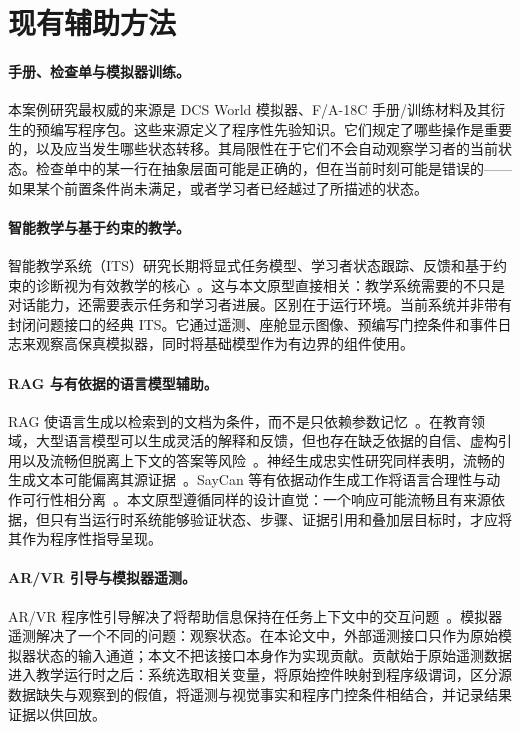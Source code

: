 \section{现有辅助方法}\label{sec:bg-existing}

\paragraph{手册、检查单与模拟器训练。}
本案例研究最权威的来源是 DCS World 模拟器、F/A-18C 手册/训练材料及其衍生的预编写程序包。这些来源定义了程序性先验知识。它们规定了哪些操作是重要的，以及应当发生哪些状态转移。其局限性在于它们不会自动观察学习者的当前状态。检查单中的某一行在抽象层面可能是正确的，但在当前时刻可能是错误的——如果某个前置条件尚未满足，或者学习者已经越过了所描述的状态。

\paragraph{智能教学与基于约束的教学。}
智能教学系统（ITS）研究长期将显式任务模型、学习者状态跟踪、反馈和基于约束的诊断视为有效教学的核心~\citep{vanlehn2011relative,kulik2016its,mitrovic2012constraint,aleven2009example}。这与本文原型直接相关：教学系统需要的不只是对话能力，还需要表示任务和学习者进展。区别在于运行环境。当前系统并非带有封闭问题接口的经典 ITS。它通过遥测、座舱显示图像、预编写门控条件和事件日志来观察高保真模拟器，同时将基础模型作为有边界的组件使用。

\paragraph{RAG 与有依据的语言模型辅助。}
RAG 使语言生成以检索到的文档为条件，而不是只依赖参数记忆~\citep{lewis2020rag}。在教育领域，大型语言模型可以生成灵活的解释和反馈，但也存在缺乏依据的自信、虚构引用以及流畅但脱离上下文的答案等风险~\citep{kasneci2023chatgpt,ji2023hallucination}。神经生成忠实性研究同样表明，流畅的生成文本可能偏离其源证据~\citep{maynez2020faithfulness}。SayCan 等有依据动作生成工作将语言合理性与动作可行性相分离~\citep{ahn2022saycan}。本文原型遵循同样的设计直觉：一个响应可能流畅且有来源依据，但只有当运行时系统能够验证状态、步骤、证据引用和叠加层目标时，才应将其作为程序性指导呈现。

\paragraph{AR/VR 引导与模拟器遥测。}
AR/VR 程序性引导解决了将帮助信息保持在任务上下文中的交互问题~\citep{palmarini2018ar}。模拟器遥测解决了一个不同的问题：观察状态。在本论文中，外部遥测接口只作为原始模拟器状态的输入通道；本文不把该接口本身作为实现贡献。贡献始于原始遥测数据进入教学运行时之后：系统选取相关变量，将原始控件映射到程序级谓词，区分源数据缺失与观察到的假值，将遥测与视觉事实和程序门控条件相结合，并记录结果证据以供回放。

